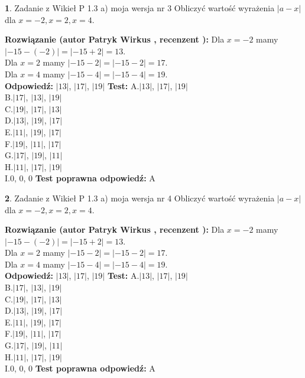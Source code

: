 \documentclass[12pt, a4paper]{article}
\theoremstyle{definition} %
\newtheorem{zad}{}
\newcommand{\zadStart}[1]{\begin{zad}#1\newline}
\newcommand{\zadStop}{\end{zad}}
\newcommand{\rozwStart}[2]{\noindent \textbf{Rozwiązanie (autor #1 , recenzent #2): }\newline}
\newcommand{\rozwStop}{\newline}
\newcommand{\odpStart}{\noindent \textbf{Odpowiedź:}\newline}
\newcommand{\odpStop}{\newline}
\newcommand{\testStart}{\noindent \textbf{Test:}\newline}
\newcommand{\testStop}{\newline}
\newcommand{\kluczStart}{\noindent \textbf{Test poprawna odpowiedź:}\newline}
\newcommand{\kluczStop}{\newline}
\begin{document}
\zadStart{Zadanie z Wikieł P 1.3 a) moja wersja nr 3}
Obliczyć wartość wyrażenia $|a - x|$ dla $x=-2,x=2,x=4$.
\zadStop
\rozwStart{Patryk Wirkus}{}
Dla $x = -2$ mamy $|-15 - (-2)| = |-15 + 2| = 13$.\\
Dla $x = 2$ mamy $|-15 - 2| = |-15 - 2| = 17$.\\
Dla $x = 4$ mamy $|-15 - 4| = |-15 - 4| = 19$.\\
\rozwStop
\odpStart
$|13|$, $|17|$, $|19|$
\odpStop
\testStart
A.$|13|$, $|17|$, $|19|$\\
B.$|17|$, $|13|$, $|19|$\\
C.$|19|$, $|17|$, $|13|$\\
D.$|13|$, $|19|$, $|17|$\\
E.$|11|$, $|19|$, $|17|$\\
F.$|19|$, $|11|$, $|17|$\\
G.$|17|$, $|19|$, $|11|$\\
H.$|11|$, $|17|$, $|19|$\\
I.$0$, $0$, $0$
\testStop
\kluczStart
A
\kluczStop



\zadStart{Zadanie z Wikieł P 1.3 a) moja wersja nr 4}
Obliczyć wartość wyrażenia $|a - x|$ dla $x=-2,x=2,x=4$.
\zadStop
\rozwStart{Patryk Wirkus}{}
Dla $x = -2$ mamy $|-15 - (-2)| = |-15 + 2| = 13$.\\
Dla $x = 2$ mamy $|-15 - 2| = |-15 - 2| = 17$.\\
Dla $x = 4$ mamy $|-15 - 4| = |-15 - 4| = 19$.\\
\rozwStop
\odpStart
$|13|$, $|17|$, $|19|$
\odpStop
\testStart
A.$|13|$, $|17|$, $|19|$\\
B.$|17|$, $|13|$, $|19|$\\
C.$|19|$, $|17|$, $|13|$\\
D.$|13|$, $|19|$, $|17|$\\
E.$|11|$, $|19|$, $|17|$\\
F.$|19|$, $|11|$, $|17|$\\
G.$|17|$, $|19|$, $|11|$\\
H.$|11|$, $|17|$, $|19|$\\
I.$0$, $0$, $0$
\testStop
\kluczStart
A
\kluczStop
\end{document}
